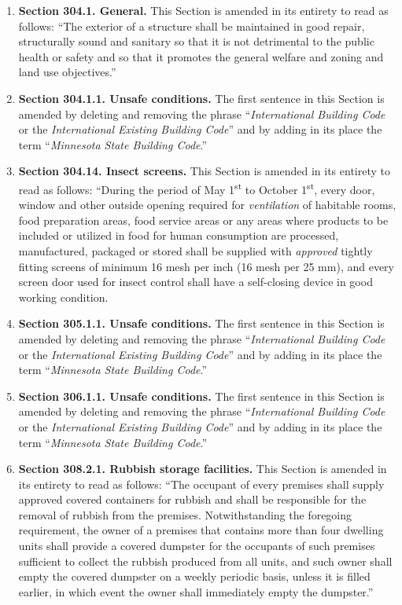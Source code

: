 \begin{enumerate}[{\indent}1)]
    \item \textbf{Section 304.1. General.} This Section is amended in its entirety to read as follows: “The exterior of a structure shall be maintained in good repair, structurally sound and sanitary so that it is not detrimental to the public health or safety and so that it promotes the general welfare and zoning and land use objectives.”
    \item \textbf{Section 304.1.1. Unsafe conditions.} The first sentence in this Section is amended by deleting and removing the phrase “\textit{International Building Code} or the \textit{International Existing Building Code}” and by adding in its place the term “\textit{Minnesota State Building Code}.”
    \item \textbf{Section 304.14. Insect screens.} This Section is amended in its entirety to read as follows: “During the period of May 1\textsuperscript{st} to October 1\textsuperscript{st}, every door, window and other outside opening required for \textit{ventilation} of habitable rooms, food preparation areas, food service areas or any areas where products to be included or utilized in food for human consumption are processed, manufactured, packaged or stored shall be supplied with \textit{approved} tightly fitting screens of minimum 16 mesh per inch (16 mesh per 25 mm), and every screen door used for insect control shall have a self-closing device in good working condition.
    \item \textbf{Section 305.1.1. Unsafe conditions.} The first sentence in this Section is amended by deleting and removing the phrase “\textit{International Building Code} or the \textit{International Existing Building Code}” and by adding in its place the term “\textit{Minnesota State Building Code}.”
    \item \textbf{Section 306.1.1. Unsafe conditions.} The first sentence in this Section is amended by deleting and removing the phrase “\textit{International Building Code} or the \textit{International Existing Building Code}” and by adding in its place the term “\textit{Minnesota State Building Code}.”
    \item \textbf{Section 308.2.1. Rubbish storage facilities.} This Section is amended in its entirety to read as follows: “The occupant of every premises shall supply approved covered containers for rubbish and shall be responsible for the removal of rubbish from the premises.  Notwithstanding the foregoing requirement, the owner of a premises that contains more than four dwelling units shall provide a covered dumpster for the occupants of such premises sufficient to collect the rubbish produced from all units, and such owner shall empty the covered dumpster on a weekly periodic basis, unless it is filled earlier, in which event the owner shall immediately empty the dumpster.”

\end{enumerate}
